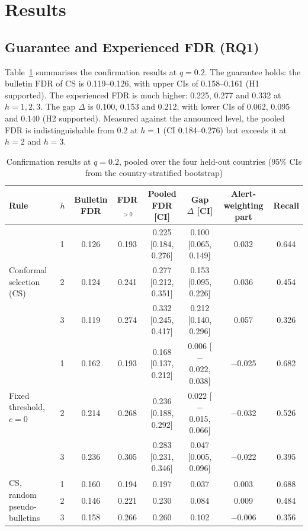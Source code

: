 \documentclass[conference]{IEEEtran}
\begin{document}
\section{Results}

\subsection{Guarantee and Experienced FDR (RQ1)}
Table~\ref{tab:main} summarises the confirmation results at $q=0.2$. The guarantee holds: the bulletin FDR of CS is 0.119--0.126, with upper CIs of 0.158--0.161 (H1 supported). The experienced FDR is much higher: 0.225, 0.277 and 0.332 at $h=1,2,3$. The gap $\Delta$ is 0.100, 0.153 and 0.212, with lower CIs of 0.062, 0.095 and 0.140 (H2 supported). Measured against the announced level, the pooled FDR is indistinguishable from 0.2 at $h=1$ (CI 0.184--0.276) but exceeds it at $h=2$ and $h=3$.

\begin{table}[t]
\caption{Confirmation results at $q=0.2$, pooled over the four held-out countries (95\% CIs from the country-stratified bootstrap)}
\label{tab:main}
\centering
\setlength{\tabcolsep}{5pt}
\begin{tabular}{llcccccc}
\toprule
Rule & $h$ & Bulletin FDR & FDR$_{>0}$ & Pooled FDR [CI] & Gap $\Delta$ [CI] & Alert-weighting part & Recall \\
\midrule
\multirow{3}{*}{Conformal selection (CS)} & 1 & 0.126 & 0.193 & 0.225 [0.184, 0.276] & 0.100 [0.065, 0.149] & 0.032 & 0.644 \\
 & 2 & 0.124 & 0.241 & 0.277 [0.212, 0.351] & 0.153 [0.095, 0.226] & 0.036 & 0.454 \\
 & 3 & 0.119 & 0.274 & 0.332 [0.245, 0.417] & 0.212 [0.140, 0.296] & 0.057 & 0.326 \\
\midrule
\multirow{3}{*}{Fixed threshold, $c=0$} & 1 & 0.162 & 0.193 & 0.168 [0.137, 0.212] & 0.006 [$-$0.022, 0.038] & $-$0.025 & 0.682 \\
 & 2 & 0.214 & 0.268 & 0.236 [0.188, 0.292] & 0.022 [$-$0.015, 0.066] & $-$0.032 & 0.526 \\
 & 3 & 0.236 & 0.305 & 0.283 [0.231, 0.346] & 0.047 [0.005, 0.096] & $-$0.022 & 0.395 \\
\midrule
\multirow{3}{*}{CS, random pseudo-bulletins} & 1 & 0.160 & 0.194 & 0.197 & 0.037 & 0.003 & 0.688 \\
 & 2 & 0.146 & 0.221 & 0.230 & 0.084 & 0.009 & 0.484 \\
 & 3 & 0.158 & 0.266 & 0.260 & 0.102 & $-$0.006 & 0.356 \\
\bottomrule
\end{tabular}
\end{table}
\end{document}
